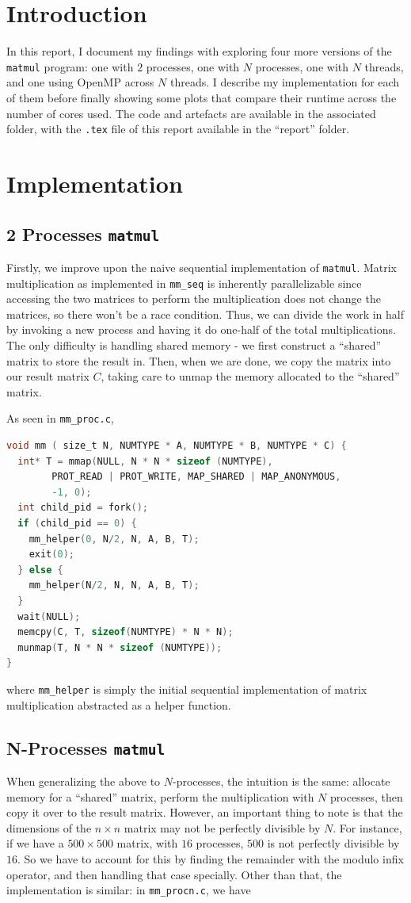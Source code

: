 \documentclass{article}
\begin{document}
\section{Introduction}
In this report, I document my findings with exploring four more versions of the \texttt{matmul} program: one with $2$ processes, one with $N $ processes, one with $N$ threads, and one using OpenMP across $N$ threads. I describe my implementation for each of them before finally showing some plots that compare their runtime across the number of cores used. The code and artefacts are available in the associated folder, with the \texttt{.tex} file of this report available in the ``report'' folder.
\section{Implementation}
\subsection{2 Processes \texttt{matmul}}
Firstly, we improve upon the naive sequential implementation of \texttt{matmul}. Matrix multiplication as implemented in \texttt{mm\_seq} is inherently parallelizable since accessing the two matrices to perform the multiplication does not change the matrices, so there won't be a race condition. Thus, we can divide the work in half by invoking a new process and having it do one-half of the total multiplications. The only difficulty is handling shared memory - we first construct a ``shared'' matrix to store the result in. Then, when we are done, we copy the matrix into our result matrix $C$, taking care to unmap the memory allocated to the ``shared'' matrix.

As seen in \texttt{mm\_proc.c},
\begin{lstlisting}[language=C]
 void mm ( size_t N, NUMTYPE * A, NUMTYPE * B, NUMTYPE * C) {
  int* T = mmap(NULL, N * N * sizeof (NUMTYPE),
		PROT_READ | PROT_WRITE, MAP_SHARED | MAP_ANONYMOUS,
		-1, 0);
  int child_pid = fork();
  if (child_pid == 0) {
    mm_helper(0, N/2, N, A, B, T);
    exit(0);
  } else {
    mm_helper(N/2, N, N, A, B, T);
  }
  wait(NULL);
  memcpy(C, T, sizeof(NUMTYPE) * N * N);
  munmap(T, N * N * sizeof (NUMTYPE));
}  
\end{lstlisting}
where \texttt{mm\_helper} is simply the initial sequential implementation of matrix multiplication abstracted as a helper function.
\subsection{N-Processes \texttt{matmul}}
When generalizing the above to $N$-processes, the intuition is the same: allocate memory for a ``shared'' matrix, perform the multiplication with $N$ processes, then copy it over to the result matrix. However, an important thing to note is that the dimensions of the $n \times n$ matrix may not be perfectly divisible by $N$. For instance, if we have a $500 \times 500$ matrix, with $16$ processes, $500$ is not perfectly divisible by $16$. So we have to account for this by finding the remainder with the modulo infix operator, and then handling that case specially. Other than that, the implementation is similar: in \texttt{mm\_procn.c}, we have
\end{document}
